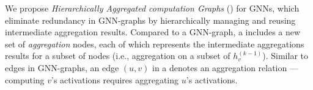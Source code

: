 We propose {\em Hierarchically Aggregated computation Graphs} (\xgs) for GNNs, which eliminate redundancy in GNN-graphs by hierarchically managing and reusing intermediate aggregation results.
Compared to a GNN-graph, a \xg includes a new set of {\em aggregation} nodes, each of which represents the intermediate aggregations results for a subset of nodes (i.e., aggregation on a subset of $h^{(k-1)}_v$).
Similar to edges in GNN-graphs, an edge $(u, v)$ in a \xg denotes an aggregation relation --- computing $v$'s activations requires aggregating $u$'s activations.



